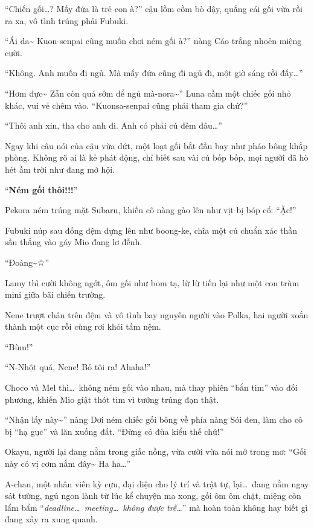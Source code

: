 \documentclass[../main.tex]{subfiles}
\begin{document}
``Chiến gối\dots? Mấy đứa là trẻ con à?'' cậu lồm cồm bò dậy, quẳng cái gối vừa rồi ra xa, vô tình trúng phải Fubuki.

``Ái da\~{} Kuon-senpai cũng muốn chơi ném gối à?'' nàng Cáo trắng nhoẻn miệng cười.

``Không. Anh muốn đi ngủ. Mà mấy đứa cũng đi ngủ đi, một giờ sáng rồi đấy\dots''

``Hơm đực\~{} Zẫn còn quá sớm để ngủ mà-nora\~{}'' Luna cầm một chiếc gối nhỏ khác, vui vẻ chêm vào. ``Kuonsa-senpai cũng phải tham gia chứ?''

``Thôi anh xin, tha cho anh đi. Anh có phải cú đêm đâu\dots''

Ngay khi câu nói của cậu vừa dứt, một loạt gối bắt đầu bay như pháo bông khắp phòng. Không rõ ai là kẻ phát động, chỉ biết sau vài cú bốp bốp, mọi người đã hò hét ầm trời như đang mở hội.

``\textbf{Ném gối thôi!!!}''

Pekora ném trúng mặt Subaru, khiến cô nàng gào lên như vịt bị bóp cổ: ``Ặc!''

Fubuki núp sau đống đệm dựng lên như boong-ke, chĩa một cú chuẩn xác thần sầu thẳng vào gáy Mio đang lơ đễnh.

``Đoàng\~{}☆''

Lamy thì cười không ngớt, ôm gối như bom tạ, lừ lừ tiến lại như một con trùm mini giữa bãi chiến trường.

Nene trượt chân trên đệm và vô tình bay nguyên người vào Polka, hai người xoắn thành một cục rồi cùng rơi khỏi tấm nệm.

``Bùm!''

``N-Nhột quá, Nene! Bỏ tôi ra! Ahaha!''

Choco và Mel thì\dots\ không ném gối vào nhau, mà thay phiên ``bắn tim'' vào đối phương, khiến Mio giật thót tim vì tưởng trúng đạn thật.

``Nhận lấy này\~{}'' nàng Dơi ném chiếc gối bông về phía nàng Sói đen, làm cho cô bị ``hạ gục'' và lăn xuống đất. ``Đừng có đùa kiểu thế chứ!''

Okayu, người lại đang nằm trong giấc nồng, vừa cười vừa nói mớ trong mơ: ``Gối này có vị cơm nắm đây\~{} Ha ha\dots''

A-chan, một nhân viên kỳ cựu, đại diện cho lý trí và trật tự, lại\dots\ đang nằm ngay sát tường, ngủ ngon lành từ lúc kể chuyện ma xong, gối ôm ôm chặt, miệng còn lẩm bẩm ``\textit{deadline\dots\ meeting\dots\ không được trễ\dots}'' mà hoàn toàn không hay biết gì đang xảy ra xung quanh.
\end{document}
